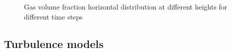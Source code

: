 \documentclass[11pt,a4paper]{article}
\begin{document}
\begin{figure}[H]
    \centering
    \caption[]{Gas volume fraction horizontal distribution at different heights for different time steps}
    \label{fig:alpha_time}
\end{figure}

\subsection{Turbulence models}
\label{sub:turbulence_models}
\end{document}
